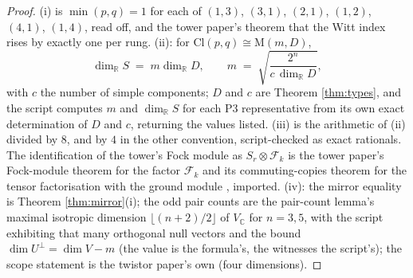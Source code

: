 \documentclass[11pt]{article}
\theoremstyle{definition}
\newcommand{\Cl}{\mathrm{Cl}}
\newcommand{\R}{\mathbb{R}}
\newcommand{\C}{\mathbb{C}}
\newcommand{\Mat}{\mathrm{M}}
\begin{document}
\begin{proof}
(i) is $\min(p,q) = 1$ for each of $(1,3)$, $(3,1)$, $(2,1)$, $(1,2)$, $(4,1)$, $(1,4)$, read off, and the tower paper's theorem that the Witt index rises by exactly one per rung. (ii): for $\Cl(p,q) \cong \Mat(m, D)$,
\[
\dim_{\R} S \;=\; m \dim_{\R} D, \qquad m \;=\; \sqrt{\frac{2^{n}}{c\,\dim_{\R} D}},
\]
with $c$ the number of simple components; $D$ and $c$ are Theorem \ref{thm:types}, and the script computes $m$ and $\dim_{\R} S$ for each P3 representative from its own exact determination of $D$ and $c$, returning the values listed. (iii) is the arithmetic of (ii) divided by $8$, and by $4$ in the other convention, script-checked as exact rationals. The identification of the tower's Fock module as $S_{r} \otimes \mathcal{F}_{k}$ is the tower paper's Fock-module theorem for the factor $\mathcal{F}_{k}$ and its commuting-copies theorem for the tensor factorisation with the ground module \cite[Thms.~4.2 and 3.2]{ButlerT3}, imported. (iv): the mirror equality is Theorem \ref{thm:mirror}(i); the odd pair counts are the pair-count lemma's maximal isotropic dimension $\lfloor (n+2)/2 \rfloor$ of $V_{\C}$ for $n = 3, 5$, with the script exhibiting that many orthogonal null vectors and the bound $\dim U^{\perp} = \dim V - m$ (the value is the formula's, the witnesses the script's); the scope statement is the twistor paper's own (four dimensions).
\end{proof}
\end{document}
